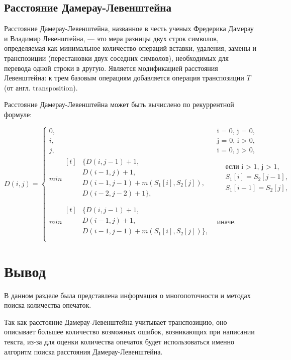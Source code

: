 \subsection{Расстояние Дамерау-Левенштейна}
Расстояние Дамерау-Левенштейна, названное в честь ученых Фредерика Дамерау и Владимир Левенштейна, --- это мера разницы двух строк символов, определяемая как минимальное количество операций вставки, удаления, замены и транспозиции (перестановки двух соседних символов), необходимых для перевода одной строки в другую. Является модификацией расстояния Левенштейна: к трем базовым операциям добавляется операция транспозиции $T$ (от англ. transposition).

Расстояние Дамерау-Левенштейна может быть вычислено по рекуррентной формуле:

\begin{equation}
	\label{eq:DL}
	D(i, j) =
	\begin{cases}
		0, &\text{i = 0, j = 0,}\\
		i, &\text{j = 0, i > 0,}\\
		j, &\text{i = 0, j > 0,}\\
		min\!\begin{aligned}[t]&\{D(i, j - 1) + 1,\\
			&D(i - 1, j) + 1,\\
			&D(i - 1, j - 1) + m(S_{1}[i], S_{2}[j]), \\
			&D(i - 2, j - 2) + 1\}, \\
		\end{aligned}
		& \begin{aligned}
			& \text{если i > 1, j > 1}, \\
			& S_{1}[i] = S_{2}[j - 1], \\
			& S_{1}[i - 1] = S_{2}[j], \\
		\end{aligned}\\
		min \!\begin{aligned}[t]&\{D(i, j - 1) + 1,\\
			&D(i - 1, j) + 1, \\
			&D(i - 1, j - 1) + m(S_{1}[i], S_{2}[j])\}, \\
		\end{aligned}
		 & \text{иначе.}
	\end{cases}
\end{equation}

\section*{Вывод}
В данном разделе была представлена информация о многопоточности и методах поиска количества опечаток.

Так как расстояние Дамерау-Левенштейна учитывает транспозицию, оно описывает большее количество возможных ошибок, возникающих при написании текста, из-за для оценки количества опечаток будет использоваться именно алгоритм поиска расстояния Дамерау-Левенштейна.
